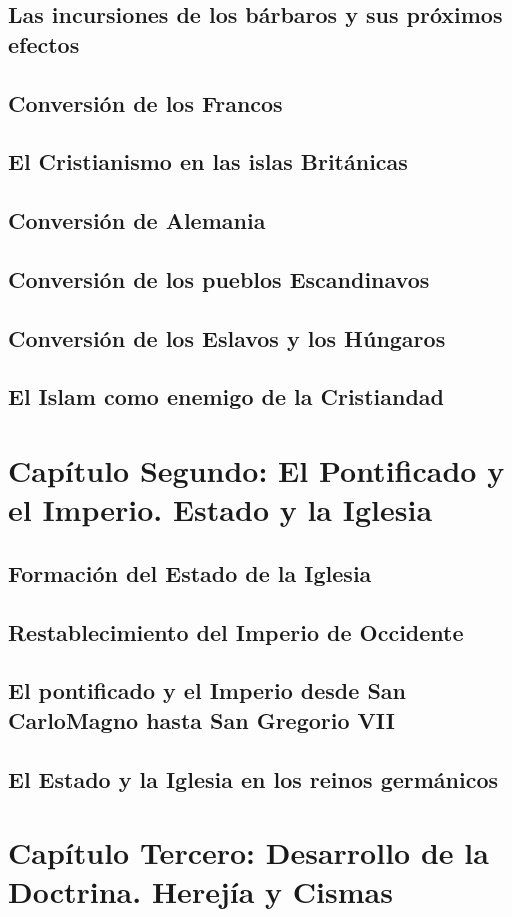\raggedbottom{} \documentclass[12pt, a4paper, openany]{book} %
\begin{document}
\section{Las incursiones de los bárbaros y sus próximos efectos}
\section{Conversión de los Francos}
\section{El Cristianismo en las islas Británicas}
\section{Conversión de Alemania}
\section{Conversión de los pueblos Escandinavos}
\section{Conversión de los Eslavos y los Húngaros}
\section{El Islam como enemigo de la Cristiandad}
\chapter{Capítulo Segundo: El Pontificado y el Imperio. Estado y la Iglesia}
\section{Formación del Estado de la Iglesia}
\section{Restablecimiento del Imperio de Occidente}
\section{El pontificado y el Imperio desde San CarloMagno hasta San Gregorio VII}
\section{El Estado y la Iglesia en los reinos germánicos}
\chapter{Capítulo Tercero: Desarrollo de la Doctrina. Herejía y Cismas}
\end{document}
